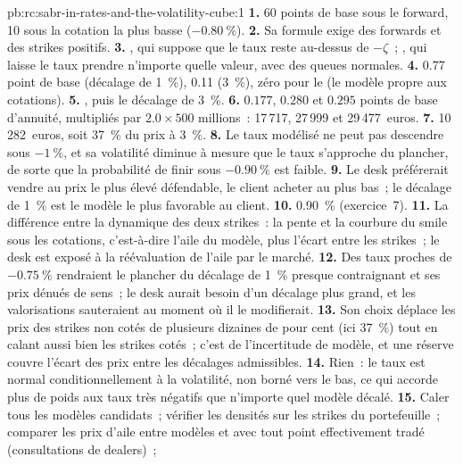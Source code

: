 \begin{solution}{pb:rc:sabr-in-rates-and-the-volatility-cube:1}
\textbf{1.} 60 points de base sous le forward, 10 sous la cotation la plus basse
($-0.80~\%$).
\textbf{2.} Sa formule exige des forwards et des strikes positifs.
\textbf{3.} , qui suppose que le taux reste au-dessus de $-\zeta$~; ,
qui laisse le taux prendre n'importe quelle valeur, avec des queues normales.
\textbf{4.} 0.77 point de base (décalage de 1~\%), 0.11 (3~\%), zéro pour le  (le
modèle propre aux cotations).
\textbf{5.} , puis le décalage de 3~\%.
\textbf{6.} $0.177$, $0.280$ et $0.295$ points de base d'annuité, multipliés par $2.0\times
500$ millions~: 17\,717, 27\,999 et 29\,477~euros.
\textbf{7.} 10\,282~euros, soit 37~\% du prix à 3~\%.
\textbf{8.} Le taux modélisé ne peut pas descendre sous $-1~\%$, et sa volatilité diminue à mesure que
le taux s'approche du plancher, de sorte que la probabilité de finir sous $-0.90~\%$ est faible.
\textbf{9.} Le desk préférerait vendre au prix le plus élevé défendable, le client
acheter au plus bas~; le décalage de 1~\% est le modèle le plus favorable au client.
\textbf{10.} 0.90~\% (exercice~7).
\textbf{11.} La différence entre la dynamique des deux strikes~: la pente et
la courbure du smile sous les cotations, c'est-à-dire l'aile du modèle, plus l'écart entre les
strikes~; le desk est exposé à la réévaluation de l'aile par le marché.
\textbf{12.} Des taux proches de $-0.75~\%$ rendraient le plancher du décalage de 1~\% presque contraignant et
ses prix dénués de sens~; le desk aurait besoin d'un décalage plus grand, et les valorisations
sauteraient au moment où il le modifierait.
\textbf{13.} Son choix déplace les prix des strikes non cotés de plusieurs dizaines de pour cent
(ici 37~\%) tout en calant aussi bien les strikes cotés~; c'est de l'incertitude de
modèle, et une réserve couvre l'écart des prix entre les décalages admissibles.
\textbf{14.} Rien~: le taux est normal conditionnellement à la volatilité, non borné vers le bas,
ce qui accorde plus de poids aux taux très négatifs que n'importe quel modèle décalé.
\textbf{15.} Caler tous les modèles candidats~; vérifier les densités sur les strikes du portefeuille~;
comparer les prix d'aile entre modèles et avec tout point effectivement tradé (consultations de dealers)~;

\end{solution}
